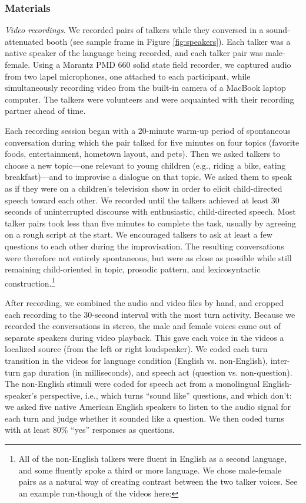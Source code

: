 \documentclass[authoryear, 12pt]{elsarticle}
\begin{document}
\subsubsection{Materials}

\textit{Video recordings}. We recorded pairs of talkers while they conversed in a sound-attenuated booth (see sample frame in Figure \ref{fig:speakers}). Each talker was a native speaker of the language being recorded, and each talker pair was male-female. Using a Marantz PMD 660 solid state field recorder, we captured audio from two lapel microphones, one attached to each participant, while simultaneously recording video from the built-in camera of a MacBook laptop computer. The talkers were volunteers and were acquainted with their recording partner ahead of time. 

Each recording session began with a 20-minute warm-up period of spontaneous conversation during which the pair talked for five minutes on four topics (favorite foods, entertainment, hometown layout, and pets). Then we asked talkers to choose a new topic---one relevant to young children (e.g., riding a bike, eating breakfast)---and to improvise a dialogue on that topic. We asked them to speak as if they were on a children's television show in order to elicit child-directed speech toward each other. We recorded until the talkers achieved at least 30 seconds of uninterrupted discourse with enthusiastic, child-directed speech. Most talker pairs took less than five minutes to complete the task, usually by agreeing on a rough script at the start. We encouraged talkers to ask at least a few questions to each other during the improvisation. The resulting conversations were therefore not entirely spontaneous, but were as close as possible while still remaining child-oriented in topic, prosodic pattern, and lexicosyntactic construction.\footnote{All of the non-English talkers were fluent in English as a second language, and some fluently spoke a third or more language. We chose male-female pairs as a natural way of creating contrast between the two talker voices. See an example run-though of the videos here: }


After recording, we combined the audio and video files by hand, and cropped each recording to the 30-second interval with the most turn activity. Because we recorded the conversations in stereo, the male and female voices came out of separate speakers during video playback. This gave each voice in the videos a localized source (from the left or right loudspeaker). We coded each turn transition in the videos for language condition (English vs. non-English), inter-turn gap duration (in milliseconds), and speech act (question vs. non-question). The non-English stimuli were coded for speech act from a monolingual English-speaker's perspective, i.e., which turns ``sound like'' questions, and which don't: we asked five native American English speakers to listen to the audio signal for each turn and judge whether it sounded like a question. We then coded turns with at least 80\% ``yes'' responses as questions.
\end{document}
